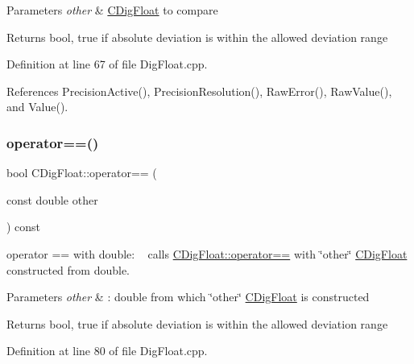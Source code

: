 \begin{DoxyParams}{Parameters}
{\em other} & \hyperlink{classCDigFloat}{C\+Dig\+Float} to compare \\
\hline
\end{DoxyParams}
\begin{DoxyReturn}{Returns}
bool, true if absolute deviation is within the allowed deviation range 
\end{DoxyReturn}


Definition at line 67 of file Dig\+Float.\+cpp.



References Precision\+Active(), Precision\+Resolution(), Raw\+Error(), Raw\+Value(), and Value().

\mbox{\label{classCDigFloat_abb8746adc3bd94e002f7674eb6ab1165}} 
\subsubsection{\texorpdfstring{operator==()}{operator==()}\hspace{0.1cm}{\footnotesize\ttfamily [2/2]}}
{\footnotesize\ttfamily bool C\+Dig\+Float\+::operator== (\begin{DoxyParamCaption}\item[{const double}]{other }\end{DoxyParamCaption}) const}



operator == with double\+: ~\newline
 calls \hyperlink{classCDigFloat_ad8980d984bf2bab71d15b830fd0180a5}{C\+Dig\+Float\+::operator==} with \char`\"{}other\char`\"{} \hyperlink{classCDigFloat}{C\+Dig\+Float} constructed from double. 


\begin{DoxyParams}{Parameters}
{\em other} & \+: double from which \char`\"{}other\char`\"{} \hyperlink{classCDigFloat}{C\+Dig\+Float} is constructed \\
\hline
\end{DoxyParams}
\begin{DoxyReturn}{Returns}
bool, true if absolute deviation is within the allowed deviation range 
\end{DoxyReturn}


Definition at line 80 of file Dig\+Float.\+cpp.



